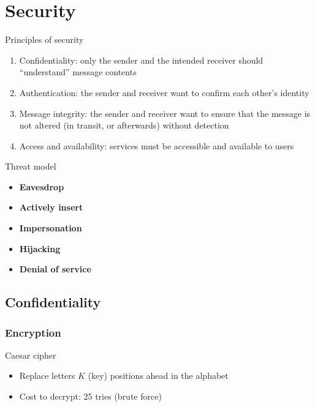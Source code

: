 \section{Security}

\begin{knBox}
    {Principles of security}
    \begin{enumerate}
        \item Confidentiality: only the sender and the intended receiver should “understand” message contents
        \item Authentication: the sender and receiver want to confirm each other's identity
        \item Message integrity: the sender and receiver want to ensure that the message is not altered (in transit, or afterwards) without detection
        \item Access and availability: services must be accessible and available to users
    \end{enumerate}
\end{knBox}

\begin{knBox}
    {Threat model}
    \begin{itemize}
        \item \textbf{Eavesdrop}
        \item \textbf{Actively insert}
        \item \textbf{Impersonation}
        \item \textbf{Hijacking}
        \item \textbf{Denial of service}
    \end{itemize}
\end{knBox}

\subsection{Confidentiality}

\subsubsection{Encryption}

\begin{definition}
    {Caesar cipher}
    \begin{itemize}
        \item Replace letters $K$ (key) positions ahead in the alphabet
        \item Cost to decrypt: 25 tries (brute force)
    \end{itemize}
\end{definition}

